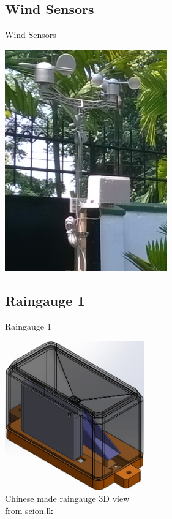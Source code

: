 \documentclass[xcolor=dvipsnames,beamer,unknownkeysallowed]{beamer} %
\begin{document}
\subsection{Wind Sensors}
\begin{frame}[fragile]{Wind Sensors}

\begin{center}
 \includegraphics[width=7cm]{MWSv1_sensors}
\end{center}

\end{frame}

\subsection{Raingauge 1}
\begin{frame}[fragile]{Raingauge 1}

\begin{center}
 \includegraphics[width=6cm]{MWSv1_rain1}\\
\vspace{5mm}
Chinese made raingauge 3D view\\
from scion.lk
\end{center}

\end{frame}
\end{document}
